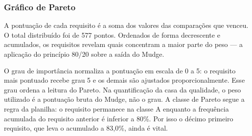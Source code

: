 \subsubsection{Gráfico de Pareto}

A pontuação de cada requisito é a soma dos valores das comparações que venceu. O total distribuído foi de 577 pontos. Ordenados de forma decrescente e acumulados, os requisitos revelam quais concentram a maior parte do peso --- a aplicação do princípio 80/20 sobre a saída do Mudge.

O grau de importância normaliza a pontuação em escala de 0 a 5: o requisito mais pontuado recebe grau 5 e os demais são ajustados proporcionalmente. Esse grau ordena a leitura do Pareto. Na quantificação da casa da qualidade, o peso utilizado é a pontuação bruta do Mudge, não o grau. A classe de Pareto segue a regra da planilha: o requisito permanece na classe A enquanto a frequência acumulada do requisito anterior é inferior a 80\%. Por isso o décimo primeiro requisito, que leva o acumulado a 83,0\%, ainda é vital.



